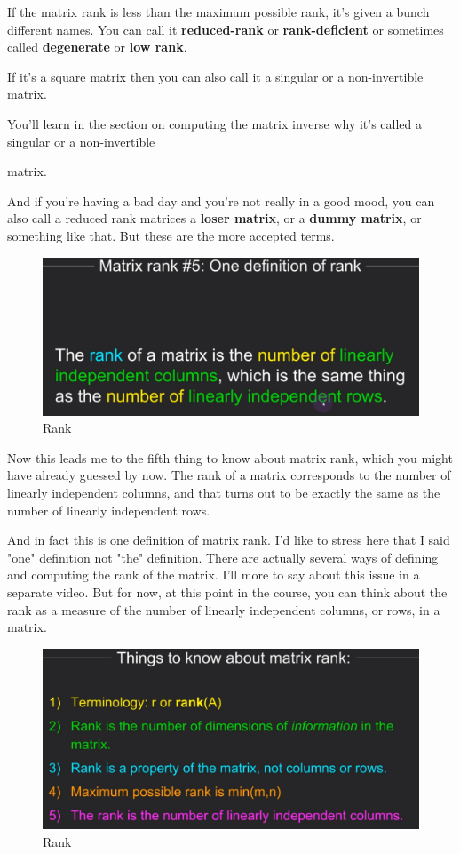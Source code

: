 \documentclass[fleqn,10pt]{olplainarticle}
\theoremstyle{definition}
\theoremstyle{remark}
\begin{document}
If the matrix rank is less than the maximum possible rank, it's given a bunch different names. You can call it \textbf{reduced-rank} or \textbf{rank-deficient} or sometimes called \textbf{degenerate} or \textbf{low rank}.

If it's a square matrix then you can also call it a singular or a non-invertible matrix.

You'll learn in the section on computing the matrix inverse why it's called a singular or a non-invertible

matrix.

And if you're having a bad day and you're not really in a good mood, you can also call a reduced rank matrices a \textbf{loser matrix}, or a \textbf{dummy matrix}, or something like that. But these are the more accepted terms.

\begin{figure}[ht]
	\centering
	\includegraphics[width=0.5\linewidth]{images/rank-11.png}
	\caption{Rank}
	\label{fig:rank_11}
\end{figure}

Now this leads me to the fifth thing to know about matrix rank, which you might have already guessed by now. The rank of a matrix corresponds to the number of linearly independent columns, and that turns out to be exactly the same as the number of linearly independent rows.

And in fact this is one definition of matrix rank. I'd like to stress here that I said "one" definition not "the" definition. There are actually several ways of defining and computing the rank of the matrix. I'll more to say about this issue in a separate video. But for now, at this point in the course, you can think about the rank as a measure of the number of linearly independent columns, or rows, in a matrix.

\begin{figure}[ht]
	\centering
	\includegraphics[width=0.5\linewidth]{images/rank-12.png}
	\caption{Rank}
	\label{fig:rank_12}
\end{figure}
\end{document}
